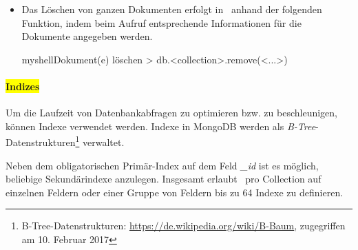 \begin{itemize}
\item Das Löschen von ganzen Dokumenten erfolgt in \mongo\ anhand der folgenden Funktion, indem beim Aufruf entsprechende Informationen für die Dokumente angegeben werden.
\begin{listingsboxShell}[label={lst:remove}]{myshell}{Dokument(e) löschen}
> db.<collection>.remove(<...>)
\end{listingsboxShell}
\end{itemize}

\paragraph{\colorbox{yellow}{Indizes}}
Um die Laufzeit von Datenbankabfragen zu optimieren bzw. zu beschleunigen, können Indexe verwendet werden. Indexe in MongoDB werden als \textit{B-Tree}-Datenstrukturen\footnote{B-Tree-Datenstrukturen: \url{https://de.wikipedia.org/wiki/B-Baum}, zugegriffen am 10. Februar 2017} verwaltet.

Neben dem obligatorischen Primär-Index auf dem Feld \textit{\_id} ist es möglich, beliebige Sekundärindexe anzulegen. Insgesamt erlaubt \mongo\, pro Collection auf einzelnen Feldern oder einer Gruppe von Feldern bis zu 64 Indexe zu definieren.

